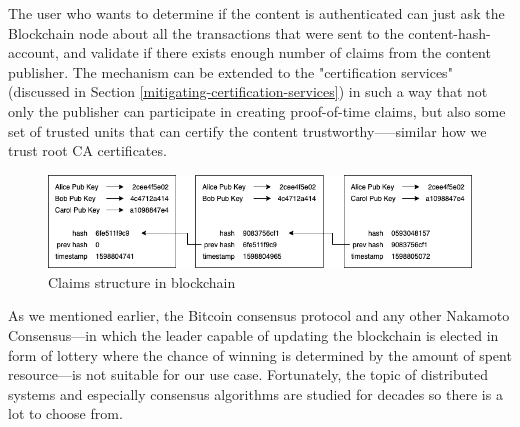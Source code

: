 \documentclass[nostrict]{szablonPG}
\begin{document}
The user who wants to determine if the content is authenticated can just ask the Blockchain node about all the transactions that were sent to the content-hash-account, and validate if there exists enough number of claims from the content publisher. 
The mechanism can be extended to the "certification services" (discussed in Section \ref{mitigating-certification-services}) in such a way that not only the publisher can participate in creating proof-of-time claims, but also some set of trusted units that can certify the content trustworthy–––similar how we trust root CA certificates. 
\begin{figure}[h!]
\includegraphics[width=\textwidth]{img/claims-structure.png}
\centering
\caption{Claims structure in blockchain}
\label{fig:claims-structure}
\end{figure} 

As we mentioned earlier, the Bitcoin consensus protocol and any other Nakamoto Consensus––in which the leader capable of updating the blockchain is elected in form of lottery where the chance of winning is determined by the amount of spent resource––is not suitable for our use case. Fortunately, the topic of distributed systems and especially consensus algorithms are studied for decades so there is a lot to choose from.
\end{document}

